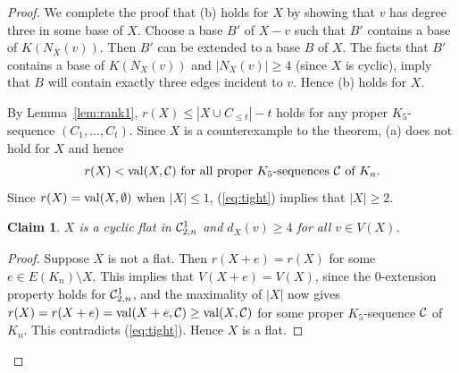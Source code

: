 \documentclass{daj}
\newtheorem{claim}[thm]{Claim}\theoremstyle{plain}
\begin{document}
\begin{proof}
We complete the proof that (b) holds for $X$ by showing that $v$ has degree three in some base of $X$. 
Choose a base $B'$ of $X-v$ such that $B'$ contains a base of $K(N_X(v))$. Then $B'$ can be extended to a base $B$ of $X$. The facts that $B'$ contains a base of $K(N_X(v))$ and $|N_X(v)|\geq 4$ (since $X$ is cyclic), imply that $B$ will contain exactly three edges incident to $v$. Hence (b) holds for $X$.


By Lemma~\ref{lem:rank1},
$r(X)\leq |X\cup C_{\leq t}|-t$ holds
for any proper $K_{5}$-sequence  $(C_1,\dots, C_t)$.
Since $X$ is a counterexample to the theorem, (a) does not hold for $X$ and hence 
\begin{equation}\label{eq:tight}
\mbox{$r(X)<{\rm val}(X,{\cal C})$ for all proper $K_{5}$-sequences  ${\cal  C}$ of $K_n$.}
\end{equation}
%
Since $r(X)={\rm val}(X,\emptyset)$ when $|X|\leq 1$, (\ref{eq:tight}) implies that $|X|\geq 2$.


\begin{claim}\label{claim:connected}
$X$ is a cyclic flat in ${\cal C}_{2,n}^1$ and $d_X(v)\geq 4$ for all $v\in V(X)$.
\end{claim}
\begin{proof}
Suppose $X$ is not a flat. Then $r(X+e)=r(X)$ for some $e\in E(K_n)\setminus X$. This implies that  $V(X+e)=V(X)$, since the 0-extension property holds for ${\cal C}^1_{2,n}$,  and the maximality of $|X|$ now gives $r(X)=r(X+e)={\rm val}(X+e,{\cal C})\geq {\rm val}(X,{\cal C})$ for some proper $K_{5}$-sequence  $\cal C$ of $K_n$. This contradicts (\ref{eq:tight}).  Hence $X$ is a flat.


\end{proof}
\end{proof}
\end{document}
